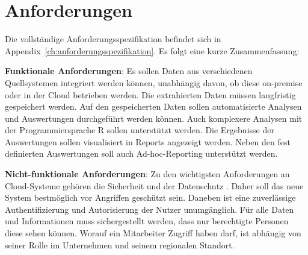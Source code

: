 \section{Anforderungen}
\label{sec:anforderungen}
 Die vollständige Anforderungsspezifikation befindet sich in Appendix~\ref{ch:anforderungsspezifikation}. Es folgt eine kurze Zusammenfassung:
 
\textbf{Funktionale Anforderungen}: Es sollen Daten aus verschiedenen Quellsystemen integriert werden können, unabhängig davon, ob diese on-premise oder in der Cloud betrieben werden. Die extrahierten Daten müssen langfristig gespeichert werden. Auf den gespeicherten Daten sollen automatisierte Analysen und Auswertungen durchgeführt werden können. Auch komplexere Analysen mit der Programmiersprache R sollen unterstützt werden. Die Ergebnisse der Auswertungen sollen visualisiert in Reports angezeigt werden. Neben den fest definierten Auswertungen soll auch Ad-hoc-Reporting unterstützt werden. 

\textbf{Nicht-funktionale Anforderungen}: Zu den wichtigsten Anforderungen an Cloud-Systeme gehören die Sicherheit und der Datenschutz \cite{gurjar_cloud_2013}. Daher soll das neue System bestmöglich vor Angriffen geschützt sein. Daneben ist eine zuverlässige Authentifizierung und Autorisierung der Nutzer unumgänglich. Für alle Daten und Informationen muss sichergestellt werden, dass nur berechtigte Personen diese sehen können. Worauf ein Mitarbeiter Zugriff haben darf, ist abhängig von seiner Rolle im Unternehmen und seinem regionalen Standort.